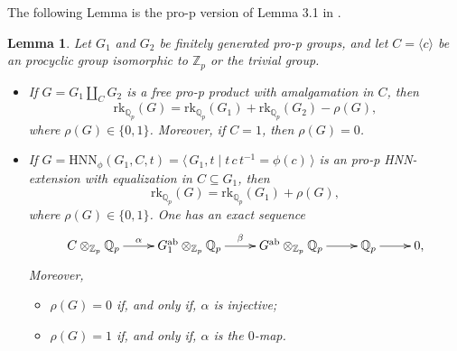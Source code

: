 \documentclass[10pt]{amsart}
\theoremstyle{plain}
\newtheorem{Lemma}[prop]{Lemma}
\theoremstyle{definition}
\theoremstyle{remark}
\numberwithin{prop}{section}
\numberwithin{example}{section}
\numberwithin{equation}{section}
\newcommand{\Z}{\mathbb{Z}}
\newcommand{\Q}{\mathbb{Q}}
\newcommand{\rk}{\mathrm{rk}}
\newcommand{\ab}{\mathrm{ab}}
\newcommand{\HNN}{\mathrm{HNN}}
\begin{document}
The following Lemma is the  pro-p version  of  Lemma 3.1 in \cite{jh}. 
\begin{Lemma}
	\label{l2}
	Let $G_1$ and  $G_2$ be  finitely generated pro-p groups, and let $C=\langle c \rangle$ be an  procyclic group isomorphic to $\Z_p$ or the trivial group.
	\begin{itemize}
		\item[(a)] If $G=G_1\amalg_{C}G_2$ is a free pro-p  product with amalgamation in $C$, then 
		\begin{equation}
		\label{eq:baslem1}
		\rk_{\Q_p}(G)=\rk_{\Q_p}(G_1)+\rk_{\Q_p}(G_2)-\rho(G),
		\end{equation}
		where $\rho(G) \in \{0,1\}$. Moreover, if $C=1$, then $\rho(G)=0$. 
		\item[(b)] If $G=\HNN_\phi(G_1,C,t)=\langle\, G_1,t\mid t\,c\, t^{-1}=\phi(c)\,\rangle$ is an pro-p HNN-extension with 
		equalization in $C\subseteq G_1$, then 
		\begin{equation}
		\label{eq:baslem2}
		\rk_{\Q_p}(G)=\rk_{\Q_p}(G_1)+\rho(G),
		\end{equation} 
		where $\rho(G)\in\{0,1\}$. One has an exact sequence 
		\begin{equation}
		\label{eq:baslem3}
		\xymatrix{
			C\otimes_{\Z_p}\Q_p\ar[r]^-{\alpha}& 
			G_1^{\ab}\otimes_{\Z_p}\Q_p \ar[r]^-{\beta}&
			G^{\ab}\otimes_{\Z_p}\Q_p  \ar[r]&
			\Q_p\ar[r]&0,
		}
		\end{equation}
		Moreover, 
		\begin{itemize}
			\item[(1)] $\rho(G)=0$ if, and only if, $\alpha$ is injective;
			\item[(2)] $\rho(G)=1$ if, and only if, $\alpha$ is the $0$-map. 
		\end{itemize}
	\end{itemize}
\end{Lemma}
\end{document}
